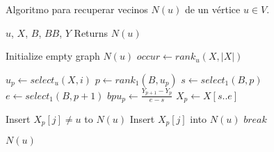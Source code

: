 \begin{algorithm}[H]
\caption{Algoritmo para recuperar vecinos $N(u)$ de un vértice $u \in V$.}
\label{alg:neighbors}
\begin{algorithmic}[1]
    \REQUIRE $u$, $X$, $B$, $BB$, $Y$
    \ENSURE Returns $N(u)$

    \STATE Initialize empty graph $N(u)$
    \STATE $occur \leftarrow rank_{u}(X, |X|)$

        	\STATE $u_{p} \leftarrow select_{u}(X, i)$
        	\STATE $p \leftarrow rank_{1}(B, u_{p})$
        	\STATE $s \leftarrow select_{1}(B, p)$
    		\STATE $e \leftarrow select_{1}(B, p + 1)$
        	\STATE $bpu_{p} \leftarrow \frac{Y_{p + 1} - Y_{p}}{e - s}$
        	\STATE $X_{p} \leftarrow X[s..e]$

       		
            			\STATE Insert $X_{p}[j] \neq u$ to $N(u)$
            		\ELSE
                    			\STATE Insert $X_{p}[j]$ into $N(u)$
                    			\STATE $break$
                			\ENDIF
            			\ENDFOR
            		\ENDIF
            		
            	\ENDIF
        \ENDFOR
    \ENDFOR

    \RETURN $N(u)$
\end{algorithmic}
\end{algorithm}
